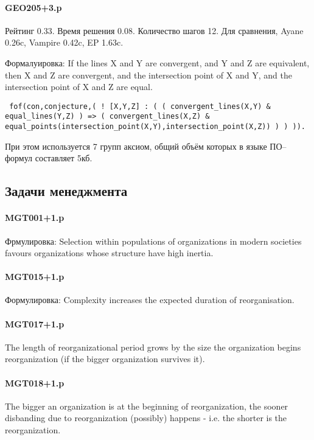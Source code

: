 \paragraph{GEO205+3.p}
Рейтинг 0.33. Время решения 0.08. Количество шагов 12. Для сравнения, Ayane 0.26c, Vampire 0.42c, EP 1.63c.

Формалуировка: If the lines X and Y are convergent, and Y and Z are  equivalent, then X and Z are convergent, and the intersection   point of X and Y, and the intersection point of X and Z are equal.

\texttt{
fof(con,conjecture,(
    ! [X,Y,Z] :
      ( ( convergent\_lines(X,Y)
        \& equal\_lines(Y,Z) )
     => ( convergent\_lines(X,Z)
        \& equal\_points(intersection\_point(X,Y),intersection\_point(X,Z)) ) ) )).}

При этом используется 7 групп аксиом, общий объём которых в языке ПО--формул составляет 5кб.

\subsection{Задачи менеджмента}

\paragraph{MGT001+1.p}

Фрмулировка: Selection within populations of organizations in modern societies favours organizations whose structure have high inertia.

\paragraph{MGT015+1.p}

Формулировка: Complexity increases the expected duration of reorganisation.

\paragraph{MGT017+1.p}
 The length of reorganizational period grows by the size the organization begins reorganization (if the bigger organization survives it).

\paragraph{MGT018+1.p}
The bigger an organization is at the beginning of reorganization, the sooner disbanding due to reorganization (possibly) happens - i.e. the shorter is the reorganization.


